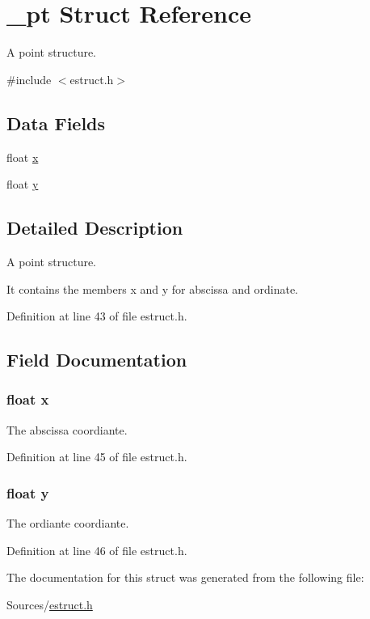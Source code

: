 \hypertarget{struct__pt}{\section{\-\_\-pt Struct Reference}
\label{struct__pt}
}


A point structure.  




{\ttfamily \#include $<$estruct.\-h$>$}

\subsection*{Data Fields}
\begin{DoxyCompactItemize}
\item 
float \hyperlink{struct__pt_ad0da36b2558901e21e7a30f6c227a45e}{x}
\item 
float \hyperlink{struct__pt_aa4f0d3eebc3c443f9be81bf48561a217}{y}
\end{DoxyCompactItemize}


\subsection{Detailed Description}
A point structure. 

It contains the members x and y for abscissa and ordinate. 

Definition at line 43 of file estruct.\-h.



\subsection{Field Documentation}
\hypertarget{struct__pt_ad0da36b2558901e21e7a30f6c227a45e}{
\subsubsection[{x}]{\setlength{\rightskip}{0pt plus 5cm}float x}}\label{struct__pt_ad0da36b2558901e21e7a30f6c227a45e}
The abscissa coordiante. 

Definition at line 45 of file estruct.\-h.

\hypertarget{struct__pt_aa4f0d3eebc3c443f9be81bf48561a217}{
\subsubsection[{y}]{\setlength{\rightskip}{0pt plus 5cm}float y}}\label{struct__pt_aa4f0d3eebc3c443f9be81bf48561a217}
The ordiante coordiante. 

Definition at line 46 of file estruct.\-h.



The documentation for this struct was generated from the following file\-:\begin{DoxyCompactItemize}
\item 
Sources/\hyperlink{estruct_8h}{estruct.\-h}\end{DoxyCompactItemize}
